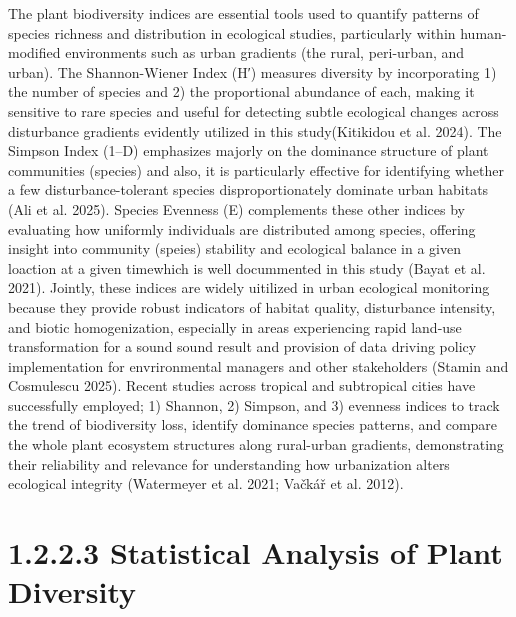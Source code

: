 The plant biodiversity indices are essential tools used to quantify patterns of species richness and distribution in ecological studies, particularly within human-modified environments such as urban gradients (the rural, peri-urban, and urban). The Shannon-Wiener Index (H′) measures diversity by incorporating 1) the number of species and 2) the proportional abundance of each, making it sensitive to rare species and useful for detecting subtle ecological changes across disturbance gradients evidently utilized in this study(Kitikidou et al. 2024). The Simpson Index (1--D) emphasizes majorly on the dominance structure of plant communities (species) and also, it is particularly effective for identifying whether a few disturbance-tolerant species disproportionately dominate urban habitats (Ali et al. 2025). Species Evenness (E) complements these other indices by evaluating how uniformly individuals are distributed among species, offering insight into community (speies) stability and ecological balance in a given loaction at a given timewhich is well docummented in this study (Bayat et al. 2021). Jointly, these indices are widely uitilized in urban ecological monitoring because they provide robust indicators of habitat quality, disturbance intensity, and biotic homogenization, especially in areas experiencing rapid land-use transformation for a sound sound result and provision of data driving policy implementation for envrironmental managers and other stakeholders (Stamin and Cosmulescu 2025). Recent studies across tropical and subtropical cities have successfully employed; 1) Shannon, 2) Simpson, and 3) evenness indices to track the trend of biodiversity loss, identify dominance species patterns, and compare the whole plant ecosystem structures along rural-urban gradients, demonstrating their reliability and relevance for understanding how urbanization alters ecological integrity (Watermeyer et al. 2021; Vačkář et al. 2012).
\hypertarget{statistical-analysis-of-plant-diversity}{%
\section{\texorpdfstring{\textbf{1.2.2.3 Statistical Analysis of Plant Diversity}}{1.2.2.3 Statistical Analysis of Plant Diversity}}\label{statistical-analysis-of-plant-diversity}}

